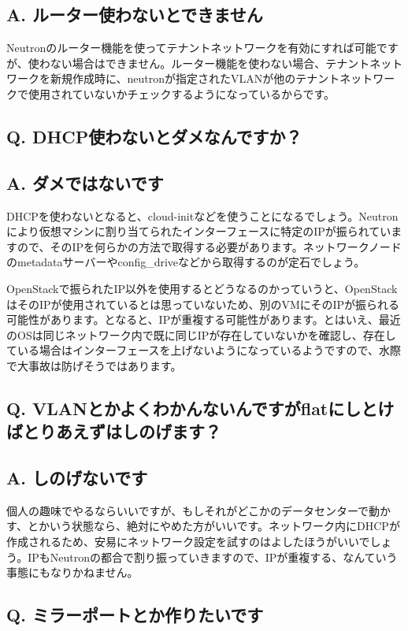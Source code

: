 \documentclass[9pt,b5paper,tombo,openany]{jsbook}
\begin{document}
\subsection*{{\LARGE\bfseries A.} ルーター使わないとできません}
Neutronのルーター機能を使ってテナントネットワークを有効にすれば可能ですが、使わない場合はできません。ルーター機能を使わない場合、テナントネットワークを新規作成時に、neutronが指定されたVLANが他のテナントネットワークで使用されていないかチェックするようになっているからです。

\subsection*{{\LARGE\bfseries Q.} DHCP使わないとダメなんですか？}
\subsection*{{\LARGE\bfseries A.} ダメではないです}
DHCPを使わないとなると、cloud-initなどを使うことになるでしょう。Neutronにより仮想マシンに割り当てられたインターフェースに特定のIPが振られていますので、そのIPを何らかの方法で取得する必要があります。ネットワークノードのmetadataサーバーやconfig\_driveなどから取得するのが定石でしょう。

OpenStackで振られたIP以外を使用するとどうなるのかっていうと、OpenStackはそのIPが使用されているとは思っていないため、別のVMにそのIPが振られる可能性があります。となると、IPが重複する可能性があります。とはいえ、最近のOSは同じネットワーク内で既に同じIPが存在していないかを確認し、存在している場合はインターフェースを上げないようになっているようですので、水際で大事故は防げそうではあります。

\subsection*{{\LARGE\bfseries Q.} VLANとかよくわかんないんですがflatにしとけばとりあえずはしのげます？}
\subsection*{{\LARGE\bfseries A.} しのげないです}
個人の趣味でやるならいいですが、もしそれがどこかのデータセンターで動かす、とかいう状態なら、絶対にやめた方がいいです。ネットワーク内にDHCPが作成されるため、安易にネットワーク設定を試すのはよしたほうがいいでしょう。IPもNeutronの都合で割り振っていきますので、IPが重複する、なんていう事態にもなりかねません。

\subsection*{{\LARGE\bfseries Q.} ミラーポートとか作りたいです}
\end{document}
